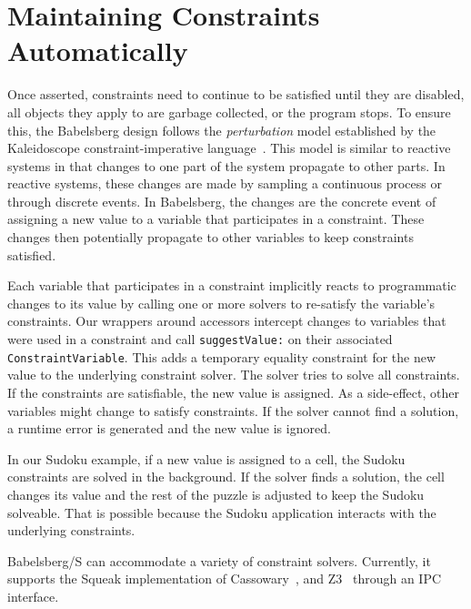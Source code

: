 \section{Maintaining Constraints Automatically}
\label{sec:maintain_constraints}

Once asserted, constraints need to continue to be satisfied until they
are disabled, all objects they apply to are garbage collected, or the
program stops. To ensure this, the Babelsberg design follows the
\emph{perturbation} model established by the Kaleidoscope
constraint-imperative language~\cite{lopez-asi-1994}. This model is
similar to reactive systems in that changes to one part of the system
propagate to other parts. In reactive systems, these changes are made
by sampling a continuous process or through discrete events. In
Babelsberg, the changes are the concrete event of assigning a new
value to a variable that participates in a constraint. These changes
then potentially propagate to other variables to keep constraints
satisfied.

Each variable that participates in a constraint implicitly reacts to
programmatic changes to its value by calling one or more solvers to
re-satisfy the variable's constraints. Our wrappers around accessors
intercept changes to variables that were used in a constraint and call
\lstinline!suggestValue:! on their associated
\lstinline!ConstraintVariable!. This adds a temporary equality
constraint for the new value to the underlying constraint solver. The
solver tries to solve all constraints. If the constraints are
satisfiable, the new value is assigned. As a side-effect, other
variables might change to satisfy constraints. If the solver cannot
find a solution, a runtime error is generated and the new value is
ignored.

In our Sudoku example, if a new value is assigned to a cell, the
Sudoku constraints are solved in the background. If the solver finds a
solution, the cell changes its value and the rest of the puzzle is
adjusted to keep the Sudoku solveable. That is possible because the
Sudoku application interacts with the underlying constraints.

Babelsberg/S can accommodate a variety of constraint
solvers. Currently, it supports the Squeak implementation of
Cassowary~\cite{badros-tochi-2001}, and Z3~\cite{de2008z3} 
through an \textsc{IPC} interface.

